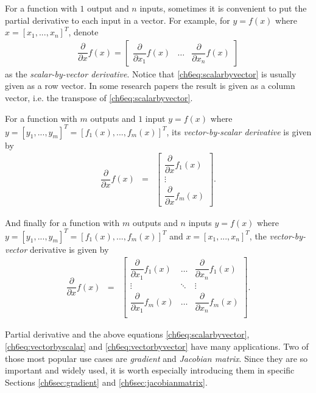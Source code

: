 For a function with $1$ output and $n$ inputs, sometimes it is convenient to put the partial derivative to each input in a vector. For example, for $y=f(x)$ where $x = \left[x_1,...,x_n\right]^T$, denote
\begin{eqnarray}
	\dfrac{\partial}{\partial x}f(x) = \left[\begin{array}{ccc}
	\dfrac{\partial}{\partial x_1}f(x) &
	\ldots &
	\dfrac{\partial}{\partial x_n}f(x)
	\end{array}\right] \label{ch6eq:scalarbyvector}
\end{eqnarray}
as the \textit{scalar-by-vector derivative}. Notice that \eqref{ch6eq:scalarbyvector} is usually given as a row vector. In some research papers the result is given as a column vector, i.e. the transpose of \eqref{ch6eq:scalarbyvector}.

For a function with $m$ outputs and $1$ input $y=f(x)$ where $y = \left[y_1,...,y_m\right]^T = \left[f_1(x),...,f_m(x)\right]^T$, its \textit{vector-by-scalar derivative} is given by
\begin{eqnarray}
	\dfrac{\partial}{\partial x}f(x) &=& \left[\begin{array}{c}
	\dfrac{\partial}{\partial x}f_1(x) \\
	\vdots \\
	\dfrac{\partial}{\partial x}f_m(x)
	\end{array}\right]. \label{ch6eq:vectorbyscalar}
\end{eqnarray}

And finally for a function with $m$ outputs and $n$ inputs $y=f(x)$ where $y = \left[y_1,...,y_m\right]^T = \left[f_1(x),...,f_m(x)\right]^T$ and $x = \left[x_1,...,x_n\right]^T$, the \textit{vector-by-vector} derivative is given by
\begin{eqnarray}
	\dfrac{\partial}{\partial x}f(x) &=& \left[\begin{array}{ccc}
	\dfrac{\partial}{\partial x_1}f_1(x) & \ldots & \dfrac{\partial}{\partial x_n}f_1(x) \\
	\vdots & \ddots & \vdots \\
	\dfrac{\partial}{\partial x_1}f_m(x) & \ldots & \dfrac{\partial}{\partial x_n}f_m(x) \\
	\end{array}\right]. \label{ch6eq:vectorbyvector}
\end{eqnarray}

Partial derivative and the above equations \eqref{ch6eq:scalarbyvector}, \eqref{ch6eq:vectorbyscalar} and \eqref{ch6eq:vectorbyvector} have many applications. Two of those most popular use cases are \textit{gradient} and \textit{Jacobian matrix}. Since they are so important and widely used, it is worth especially introducing them in specific Sections \ref{ch6sec:gradient} and \ref{ch6sec:jacobianmatrix}.

